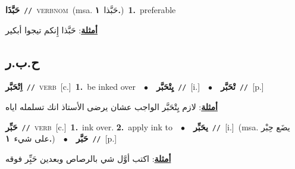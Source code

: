 \documentclass[10pt,a4paper,twoside]{article} %
\begin{document}
\begin{multicols}{2}
{\setlength\topsep{0pt}\textbf{\foreignlanguage{arabic}{حَبَّذَا}}\ {\color{gray}\texttt{//}\color{black}}\ \textsc{verb\textunderscore nom}\ \color{gray}(msa. \foreignlanguage{arabic}{حَبَّذا}~\foreignlanguage{arabic}{\textbf{١.}})\color{black}\ \textbf{1.}~preferable\  \begin{flushright}\color{gray}\foreignlanguage{arabic}{\textbf{\underline{\foreignlanguage{arabic}{أمثلة}}}: حَبَّذا إِنكم تيجوا أبكير}\end{flushright}\color{black}} \vspace{2mm}

\vspace{-3mm}
\subsection*{\color{blue}\foreignlanguage{arabic}{ح.ب.ر}\color{blue}{}} 

{\setlength\topsep{0pt}\textbf{\foreignlanguage{arabic}{اِتْحَبَّر}}\ {\color{gray}\texttt{//}\color{black}}\ \textsc{verb}\ [c.]\ \textbf{1.}~be inked over\ \ $\bullet$\ \ \setlength\topsep{0pt}\textbf{\foreignlanguage{arabic}{يِتْحَبَّر}}\ {\color{gray}\texttt{//}\color{black}}\ [i.]\ \ $\bullet$\ \ \setlength\topsep{0pt}\textbf{\foreignlanguage{arabic}{تْحَبَّر}}\ {\color{gray}\texttt{//}\color{black}}\ [p.]\  \begin{flushright}\color{gray}\foreignlanguage{arabic}{\textbf{\underline{\foreignlanguage{arabic}{أمثلة}}}: لازم يِتْحَبَّر الواجب عشان يرضى الأستاذ انك تسلمله اياه}\end{flushright}\color{black}} \vspace{2mm}

{\setlength\topsep{0pt}\textbf{\foreignlanguage{arabic}{حَبِّر}}\ {\color{gray}\texttt{//}\color{black}}\ \textsc{verb}\ [c.]\ \textbf{1.}~ink over.  \textbf{2.}~apply ink to\ \ $\bullet$\ \ \setlength\topsep{0pt}\textbf{\foreignlanguage{arabic}{يحَبِّر}}\ {\color{gray}\texttt{//}\color{black}}\ [i.]\ \color{gray}(msa. \foreignlanguage{arabic}{يضَع حِبْر على شيء}~\foreignlanguage{arabic}{\textbf{١.}})\color{black}\ \ $\bullet$\ \ \setlength\topsep{0pt}\textbf{\foreignlanguage{arabic}{حَبَّر}}\ {\color{gray}\texttt{//}\color{black}}\ [p.]\  \begin{flushright}\color{gray}\foreignlanguage{arabic}{\textbf{\underline{\foreignlanguage{arabic}{أمثلة}}}: اكتب أوَّل شي بالرصاص وبعدين حَبِِّر فوقه}\end{flushright}\color{black}} \vspace{2mm}


\end{multicols}
\end{document}
